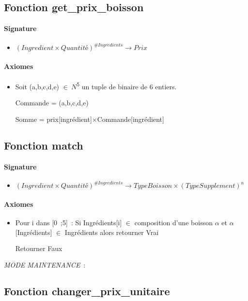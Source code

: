 \documentclass[]{article}
\begin{document}
\subsection*{Fonction get\_prix\_boisson}
\paragraph{Signature}
\begin{itemize}
\item
  $  (Ingredient \times Quantité)^{\#Ingredients} \longrightarrow Prix$
\end{itemize}
\paragraph{Axiomes}
\begin{itemize}
\item
 Soit (a,b,c,d,e) \(\in \ N\)\textsuperscript{5} un tuple de
  binaire de 6 entiers.

Commande = (a,b,c,d,e)

Somme = prix{[}ingrédient{]}\(\times \)Commande{[}ingrédient{]}
\end{itemize}

\subsection*{Fonction match}
\paragraph{Signature}
\begin{itemize}
\item
  $   (Ingredient \times Quantité)^{\#Ingredients}  \longrightarrow TypeBoisson \times (TypeSupplement)^{n}$
\end{itemize}
\paragraph{Axiomes}
\begin{itemize}
\item
 
Pour i dans {[}0~;5{]}~: Si Ingrédients{[}i{]} \(\in\) composition d'une
boisson \(\alpha \) et \(\alpha \){[}Ingrédients{]} \(\in\) Ingrédients alors retourner Vrai

Retourner Faux
\end{itemize}

\emph{MODE MAINTENANCE}~:

\subsection*{Fonction changer\_prix\_unitaire}
\end{document}
